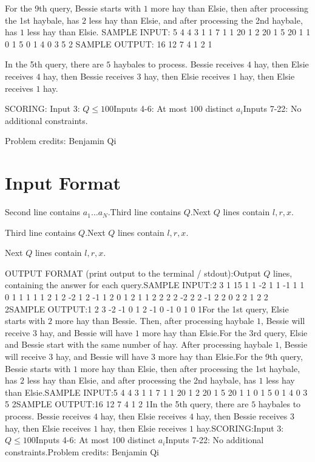 \documentclass[12pt]{article}
\begin{document}
For the 9th query, Bessie starts with $1$ more hay than Elsie, then after
processing the 1st haybale, has $2$ less hay than Elsie, and after processing
the 2nd haybale, has $1$ less hay than Elsie.
SAMPLE INPUT:
5
4 4 3 1 1
7
1 1 20
1 2 20
1 5 20
1 1 0
1 5 0
1 4 0
3 5 2
SAMPLE OUTPUT: 
16
12
7
4
1
2
1

In the 5th query, there are $5$ haybales to process. Bessie receives $4$ hay, then Elsie
receives $4$ hay, then Bessie receives $3$ hay, then Elsie receives $1$ hay,
then Elsie receives $1$ hay.

SCORING:
Input 3: $Q\le 100$Inputs 4-6: At most $100$ distinct $a_i$Inputs 7-22: No additional constraints.


Problem credits: Benjamin Qi



\section*{Input Format}
Second line contains $a_1\dots a_N$.Third line contains $Q$.Next $Q$ lines contain $l, r, x$.

Third line contains $Q$.Next $Q$ lines contain $l, r, x$.

Next $Q$ lines contain $l, r, x$.

OUTPUT FORMAT (print output to the terminal / stdout):Output $Q$ lines, containing the answer for each query.SAMPLE INPUT:2
3 1
15
1 1 -2
1 1 -1
1 1 0
1 1 1
1 1 2
1 2 -2
1 2 -1
1 2 0
1 2 1
1 2 2
2 2 -2
2 2 -1
2 2 0
2 2 1
2 2 2SAMPLE OUTPUT:1
2
3
-2
-1
0
1
2
-1
0
-1
0
1
0
1For the 1st query, Elsie starts with $2$ more hay than Bessie. Then, after
processing haybale $1$, Bessie will receive $3$ hay, and Bessie will have $1$
more hay than Elsie.For the 3rd query, Elsie and Bessie start with the same number of hay. After
processing haybale $1$, Bessie will receive $3$ hay, and Bessie will have $3$
more hay than Elsie.For the 9th query, Bessie starts with $1$ more hay than Elsie, then after
processing the 1st haybale, has $2$ less hay than Elsie, and after processing
the 2nd haybale, has $1$ less hay than Elsie.SAMPLE INPUT:5
4 4 3 1 1
7
1 1 20
1 2 20
1 5 20
1 1 0
1 5 0
1 4 0
3 5 2SAMPLE OUTPUT:16
12
7
4
1
2
1In the 5th query, there are $5$ haybales to process. Bessie receives $4$ hay, then Elsie
receives $4$ hay, then Bessie receives $3$ hay, then Elsie receives $1$ hay,
then Elsie receives $1$ hay.SCORING:Input 3: $Q\le 100$Inputs 4-6: At most $100$ distinct $a_i$Inputs 7-22: No additional constraints.Problem credits: Benjamin Qi
\end{document}
